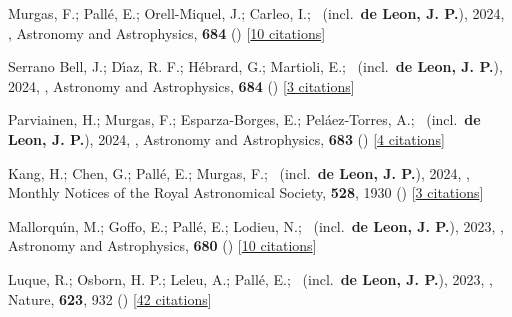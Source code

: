 \item[{\color{numcolor}\scriptsize62}] Murgas, F.; Pall{\'e}, E.; Orell-Miquel, J.; Carleo, I.; \etal\ (incl.\ \textbf{de Leon, J. P.}), 2024, , Astronomy and Astrophysics, \textbf{684} () [\href{https://ui.adsabs.harvard.edu/abs/2024A&A...684A..83M}{10 citations}]

\item[{\color{numcolor}\scriptsize61}] Serrano Bell, J.; D{\'\i}az, R. F.; H{\'e}brard, G.; Martioli, E.; \etal\ (incl.\ \textbf{de Leon, J. P.}), 2024, , Astronomy and Astrophysics, \textbf{684} () [\href{https://ui.adsabs.harvard.edu/abs/2024A&A...684A...6S}{3 citations}]

\item[{\color{numcolor}\scriptsize60}] Parviainen, H.; Murgas, F.; Esparza-Borges, E.; Pel{\'a}ez-Torres, A.; \etal\ (incl.\ \textbf{de Leon, J. P.}), 2024, , Astronomy and Astrophysics, \textbf{683} () [\href{https://ui.adsabs.harvard.edu/abs/2024A&A...683A.170P}{4 citations}]

\item[{\color{numcolor}\scriptsize59}] Kang, H.; Chen, G.; Pall{\'e}, E.; Murgas, F.; \etal\ (incl.\ \textbf{de Leon, J. P.}), 2024, , Monthly Notices of the Royal Astronomical Society, \textbf{528}, 1930 () [\href{https://ui.adsabs.harvard.edu/abs/2024MNRAS.528.1930K}{3 citations}]

\item[{\color{numcolor}\scriptsize58}] Mallorqu{\'\i}n, M.; Goffo, E.; Pall{\'e}, E.; Lodieu, N.; \etal\ (incl.\ \textbf{de Leon, J. P.}), 2023, , Astronomy and Astrophysics, \textbf{680} () [\href{https://ui.adsabs.harvard.edu/abs/2023A&A...680A..76M}{10 citations}]

\item[{\color{numcolor}\scriptsize57}] Luque, R.; Osborn, H. P.; Leleu, A.; Pall{\'e}, E.; \etal\ (incl.\ \textbf{de Leon, J. P.}), 2023, , Nature, \textbf{623}, 932 () [\href{https://ui.adsabs.harvard.edu/abs/2023Natur.623..932L}{42 citations}]

